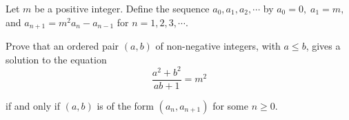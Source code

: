 Let $m$ be a positive integer. Define the sequence $a_0, a_1, a_2, \cdots$ by $a_0 = 0,\; a_1 = m,$ and $a_{n+1} = m^2a_n - a_{n-1}$ for $n = 1,2,3,\cdots$.

Prove that an ordered pair $(a,b)$ of non-negative integers, with $a \leq b$,  gives a solution to the equation\[ {\displaystyle \frac{a^2 + b^2}{ab + 1} = m^2} \]

if and only if $(a,b)$ is of the form $(a_n,a_{n+1})$ for some $n \geq 0$.